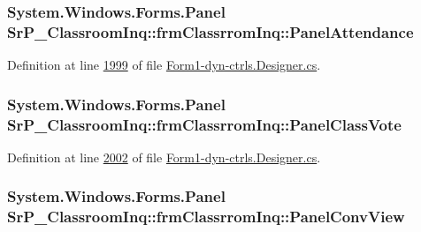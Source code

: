 \hypertarget{class_sr_p___classroom_inq_1_1frm_classrrom_inq_a45178e53b0fdc6749e2557f299ddddac}{
\subsubsection[{\-Panel\-Attendance}]{\setlength{\rightskip}{0pt plus 5cm}\-System.\-Windows.\-Forms.\-Panel {\bf \-Sr\-P\-\_\-\-Classroom\-Inq\-::frm\-Classrrom\-Inq\-::\-Panel\-Attendance}}}
\label{class_sr_p___classroom_inq_1_1frm_classrrom_inq_a45178e53b0fdc6749e2557f299ddddac}


\-Definition at line \hyperlink{_form1-dyn-ctrls_8_designer_8cs_source_l01999}{1999} of file \hyperlink{_form1-dyn-ctrls_8_designer_8cs_source}{\-Form1-\/dyn-\/ctrls.\-Designer.\-cs}.

\hypertarget{class_sr_p___classroom_inq_1_1frm_classrrom_inq_a1225290cf0284e727d8a2ce9aa2d2a33}{
\subsubsection[{\-Panel\-Class\-Vote}]{\setlength{\rightskip}{0pt plus 5cm}\-System.\-Windows.\-Forms.\-Panel {\bf \-Sr\-P\-\_\-\-Classroom\-Inq\-::frm\-Classrrom\-Inq\-::\-Panel\-Class\-Vote}}}
\label{class_sr_p___classroom_inq_1_1frm_classrrom_inq_a1225290cf0284e727d8a2ce9aa2d2a33}


\-Definition at line \hyperlink{_form1-dyn-ctrls_8_designer_8cs_source_l02002}{2002} of file \hyperlink{_form1-dyn-ctrls_8_designer_8cs_source}{\-Form1-\/dyn-\/ctrls.\-Designer.\-cs}.

\hypertarget{class_sr_p___classroom_inq_1_1frm_classrrom_inq_ae5d62ffd766ae877bf37d56567d836d5}{
\subsubsection[{\-Panel\-Conv\-View}]{\setlength{\rightskip}{0pt plus 5cm}\-System.\-Windows.\-Forms.\-Panel {\bf \-Sr\-P\-\_\-\-Classroom\-Inq\-::frm\-Classrrom\-Inq\-::\-Panel\-Conv\-View}}}
\label{class_sr_p___classroom_inq_1_1frm_classrrom_inq_ae5d62ffd766ae877bf37d56567d836d5}


